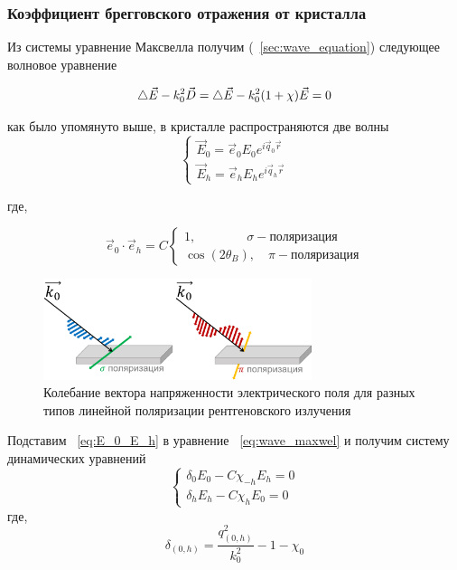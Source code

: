 
 \subsubsection{Коэффициент брегговского отражения от кристалла}
 Из системы уравнение Максвелла получим (~\ref{sec:wave_equation}) следующее волновое уравнение

\begin{equation}
 \mathop{}\!\mathbin\bigtriangleup \vec{E} - k_0^2 \vec{D} = \mathop{}\!\mathbin\bigtriangleup \vec{E} - k_0^2 (1+\chi)\vec{E} = 0
 \label{eq:wave_maxwel}
\end{equation}

как было упомянуто выше, в кристалле распространяются две волны
\begin{equation}
 \begin{cases}
   \vec{E}_0 = \vec{e}_0 E_0 e^{i\vec{q}_0\vec{r}}
   \\
   \vec{E}_h = \vec{e}_h E_h e^{i\vec{q}_h\vec{r}}
 \end{cases}
 \label{eq:E_0_E_h}
\end{equation}

где,

\begin{equation}
\vec{e}_0 \cdot \vec{e}_h = C
 \begin{cases}
   1, \quad \quad \quad \quad  \sigma    - \text{поляризация}\\
   \cos(2\theta_B), \quad   \pi - \text{поляризация}
 \end{cases}
\end{equation}

\begin{figure}[H]
  \centering
  \includegraphics[width=0.7\textwidth]{images/polarize_E.png}
  \caption{ Колебание вектора напряженности электрического поля для разных типов линейной поляризации рентгеновского излучения}
  \label{ris:polarize_E}
\end{figure}

Подставим  ~\ref{eq:E_0_E_h} в уравнение ~\ref{eq:wave_maxwel} и получим
систему динамических уравнений
\begin{equation}
 \begin{cases}
   \delta_0 E_0 - C\chi_{-h}E_h=0
   \\
   \delta_h E_h - C\chi_{h}E_0=0
 \end{cases}
\end{equation}
где,
\begin{equation}
   \delta_{(0,h)} = \frac{q_{(0,h)}^2}{k_0^2}-1-\chi_0
\end{equation}

